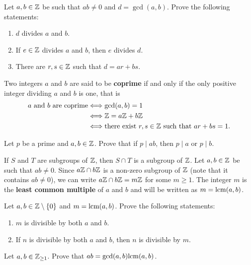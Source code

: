 \begin{exercise}
Let $a,b\in\mathbb{Z}$ be such that $ab\ne0$ and $d=\gcd(a,b)$. 
Prove the following statements:
\begin{enumerate}
\item $d$ divides $a$ and $b$.
\item If $e\in\mathbb{Z}$ divides $a$ and $b$, then $e$ divides $d$.
\item There are $r,s\in\mathbb{Z}$ such that $d=ar+bs$.
\end{enumerate}
\end{exercise}

Two integers $a$ and $b$ are said to be \textbf{coprime} if 
and only if the only positive integer dividing 
$a$ and $b$ is one, that is  
\begin{align*}
a\text{ and }b\text{ are coprime}&\Longleftrightarrow \gcd(a,b)=1\\
&\Longleftrightarrow \mathbb{Z}=a\mathbb{Z}+b\mathbb{Z}\\
&\Longleftrightarrow \text{there exist $r,s\in\mathbb{Z}$ such that $ar+bs=1$.}
\end{align*}

\begin{exercise}
        Let $p$ be a prime and 
        $a,b\in\mathbb{Z}$. Prove that if $p\mid ab$, 
        then $p\mid a$ or $p\mid b$.
\end{exercise}

If $S$ and $T$ are subgroups of $\mathbb{Z}$, then $S\cap T$
is a subgroup of $\mathbb{Z}$.
Let $a,b\in\mathbb{Z}$ be such that $ab\ne 0$. Since $a\mathbb{Z}\cap b\mathbb{Z}$ 
is a non-zero subgroup of $\mathbb{Z}$ (note that it contains $ab\ne 0$), 
we can write  $a\mathbb{Z}\cap b\mathbb{Z}=m\mathbb{Z}$
for some $m\geq1$. The integer $m$
is the \textbf{least common multiple} of $a$ and $b$ 
and will be written as $m=\mathrm{lcm}(a,b)$.

\begin{exercise}
Let $a,b\in\mathbb{Z}\setminus\{0\}$ and $m=\mathrm{lcm}(a,b)$. 
Prove the following statements:
\begin{enumerate}
        \item $m$ is divisible by both $a$ and $b$.
        \item If $n$ is divisible by both $a$ and $b$, then 
        $n$ is divisible by $m$.
\end{enumerate}
\end{exercise}

\begin{exercise}
Let $a,b\in\mathbb{Z}_{\geq1}$. Prove that 
$ab=\gcd(a,b)\mathrm{lcm}(a,b)$.
\end{exercise}

